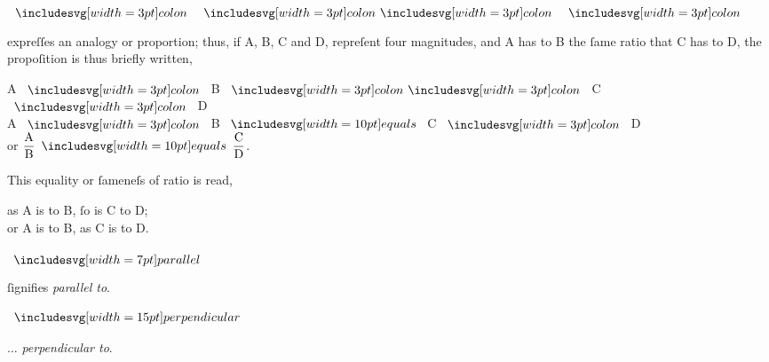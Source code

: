 \hfill

\hfill

\hfill

\hfill

\begin{minipage}[t]{0.20\textwidth}
  \begin{center}
    $\bcolon\ \bbcolon\ \bcolon$
  \end{center}
\end{minipage}%
\begin{minipage}[t]{0.80\textwidth}
  expreſſes an analogy or proportion; thus, if A, B, C and D, repreſent four magnitudes, and A has to B the ſame ratio that C has to D, the propoſition is thus briefly written,\\
  \begin{center}
    A $\bcolon$ B $\bbcolon$ C $\bcolon$ D\\
    A $\bcolon$ B $\bequals$ C $\bcolon$ D\\
    or $\dfrac{\text{A}}{\text{B}} \bequals \dfrac{\text{C}}{\text{D}}$.
  \end{center}
\end{minipage}

\begin{minipage}[t]{0.20\textwidth}
  \phantom{}
\end{minipage}
\begin{minipage}[t]{0.80\textwidth}
  This equality or ſameneſs of ratio is read,\\
  \begin{center}
    as A is to B, ſo is C to D;\\
    or A is to B, as C is to D.
  \end{center}
\end{minipage}

\begin{minipage}[t]{0.20\textwidth}
  \begin{center}
    $\bparallel$
  \end{center}
\end{minipage}
\begin{minipage}[t]{0.80\textwidth}
  ſignifies \textit{parallel to}.
\end{minipage}

\begin{minipage}[t]{0.20\textwidth}
  \begin{center}
    $\bperp$
  \end{center}
\end{minipage}
\begin{minipage}[t]{0.80\textwidth}
  $\ldots$ \textit{perpendicular to}.
\end{minipage}

